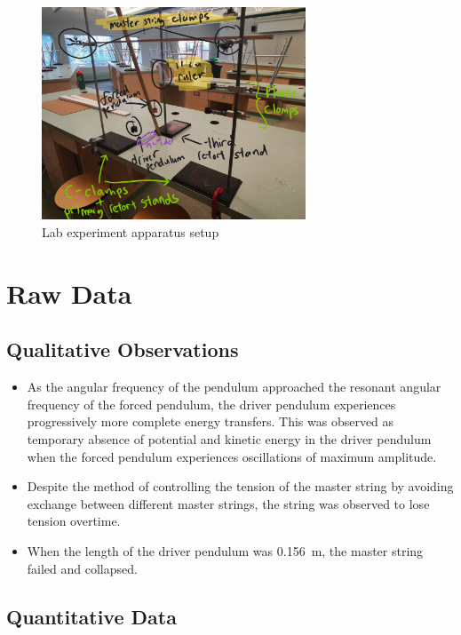 \documentclass[letterpaper, 12pt]{article}
\begin{document}
\begin{figure}[H]
    \centering
    \includegraphics[width=0.7\textwidth]{entireSetup.jpg}
    \caption{Lab experiment apparatus setup}
    \label{fig:entireSetup}
\end{figure}


\section{Raw Data}

\subsection{Qualitative Observations}

\begin{itemize}
    \item As the angular frequency of the pendulum approached the resonant angular frequency of the forced pendulum, the driver pendulum experiences progressively more complete energy transfers. This was observed as temporary absence of potential and kinetic energy in the driver pendulum when the forced pendulum experiences oscillations of maximum amplitude.
    \item Despite the method of controlling the tension of the master string by avoiding exchange between different master strings, the string was observed to lose tension overtime.
    \item When the length of the driver pendulum was \SI{0.156}{m}, the master string failed and collapsed.
\end{itemize}

\subsection{Quantitative Data}
\end{document}
